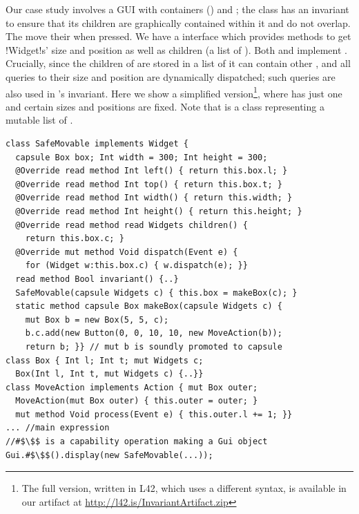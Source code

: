 Our case study involves a GUI with containers (\Q@SafeMovable@s) and \Q@Button@s;
the \Q@SafeMovable@ class has an invariant to ensure that its children are graphically contained within it and do not overlap. The \Q@Button@s move their \Q@SafeMovable@ when pressed. We have a \Q@Widget@ interface which provides methods to get \Q!Widget!s' size and position as well as children (a list of \Q@Widget@s). Both \Q@SafeMovable@s and \Q@Button@s implement \Q@Widget@. Crucially, since the children of \Q@SafeMovable@ are stored in a list of \Q@Widget@s it can contain other \Q@SafeMovable@s, and all queries to their size and position are dynamically dispatched; such queries are also used in \Q@SafeMovable@'s invariant.
Here we show a simplified version\footnote{The full version, written in L42, which uses a different syntax, is available in our artifact at \url{http://l42.is/InvariantArtifact.zip}}, where  \Q@SafeMovable@ has just one \Q@Button@ and certain sizes and positions are fixed. Note that \Q@Widgets@ is a class representing a mutable list of \Q@mut@ \Q@Widget@s.
\begin{lstlisting}
class SafeMovable implements Widget {
  capsule Box box; Int width = 300; Int height = 300;
  @Override read method Int left() { return this.box.l; }
  @Override read method Int top() { return this.box.t; }
  @Override read method Int width() { return this.width; }
  @Override read method Int height() { return this.height; }
  @Override read method read Widgets children() {
    return this.box.c; }
  @Override mut method Void dispatch(Event e) {
    for (Widget w:this.box.c) { w.dispatch(e); }}
  read method Bool invariant() {..}
  SafeMovable(capsule Widgets c) { this.box = makeBox(c); }
  static method capsule Box makeBox(capsule Widgets c) {
    mut Box b = new Box(5, 5, c);
    b.c.add(new Button(0, 0, 10, 10, new MoveAction(b));
    return b; }} // mut b is soundly promoted to capsule
class Box { Int l; Int t; mut Widgets c;
  Box(Int l, Int t, mut Widgets c) {..}}
class MoveAction implements Action { mut Box outer;
  MoveAction(mut Box outer) { this.outer = outer; }
  mut method Void process(Event e) { this.outer.l += 1; }}
... //main expression
//#$\$$ is a capability operation making a Gui object
Gui.#$\$$().display(new SafeMovable(...));
\end{lstlisting}%
